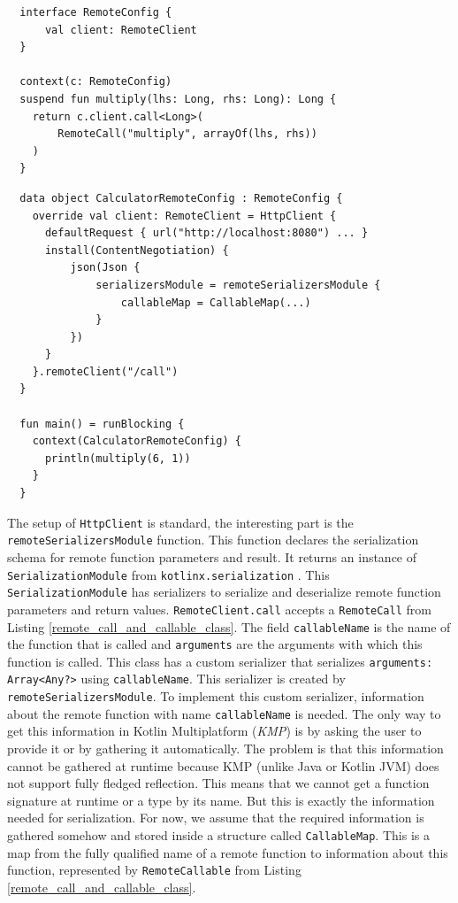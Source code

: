\documentclass[a4paper,11pt,oneside]{article}
\newcommand{\term}[1]{\textit{#1}}
\newcommand{\kotlini}[1]{\texttt{#1}}
\begin{document}
\begin{listing}[!h]
  \begin{verbatim}
  interface RemoteConfig {
      val client: RemoteClient
  }

  context(c: RemoteConfig)
  suspend fun multiply(lhs: Long, rhs: Long): Long {
    return c.client.call<Long>(
        RemoteCall("multiply", arrayOf(lhs, rhs))
    )
  }
  \end{verbatim}
  \caption{Multiply function with context}\label{multiply_client_context}
\end{listing}

\begin{listing}[!h]
  \begin{verbatim}
  data object CalculatorRemoteConfig : RemoteConfig {
    override val client: RemoteClient = HttpClient {
      defaultRequest { url("http://localhost:8080") ... }
      install(ContentNegotiation) {
          json(Json {
              serializersModule = remoteSerializersModule {
                  callableMap = CallableMap(...)
              }
          })
      }
    }.remoteClient("/call")
  }

  fun main() = runBlocking {
    context(CalculatorRemoteConfig) {
      println(multiply(6, 1))
    }
  }
  \end{verbatim}
  \caption{Remote function call}\label{multiply_client_context_call}
\end{listing}

The setup of \kotlini{HttpClient} is standard, the interesting part is the
\kotlini{remoteSerializersModule} function. This function declares the serialization schema for remote
function parameters and result. It returns an instance of \kotlini{SerializationModule} from
\texttt{kotlinx.serialization} \cite{noauthor_kotlinkotlinxserialization_2026}. This
\kotlini{SerializationModule} has serializers to serialize and deserialize remote function
parameters and return values. \kotlini{RemoteClient.call} accepts a \kotlini{RemoteCall} from Listing
\ref{remote_call_and_callable_class}. The field \kotlini{callableName} is the name of the function
that is called and \kotlini{arguments} are the arguments with which this function is called. This class
has a custom serializer that serializes \kotlini{arguments: Array<Any?>} using
\kotlini{callableName}. This serializer is created by \kotlini{remoteSerializersModule}. To
implement this custom serializer, information about the remote function with name \kotlini{callableName}
is needed. The only way to get this information in Kotlin Multiplatform (\term{KMP}) is by asking
the user to provide it or by gathering it automatically. The problem is that this information cannot be
gathered at runtime because KMP (unlike Java or Kotlin JVM) does not support fully fledged
reflection. This means that we cannot get a function signature at runtime or a type by its name. 
But this is exactly the information needed for serialization. For now, we assume that the required
information is gathered somehow and stored inside a structure called \kotlini{CallableMap}. This is
a map from the fully qualified name of a remote function to information about this function,
represented by \kotlini{RemoteCallable} from Listing \ref{remote_call_and_callable_class}.
\end{document}
